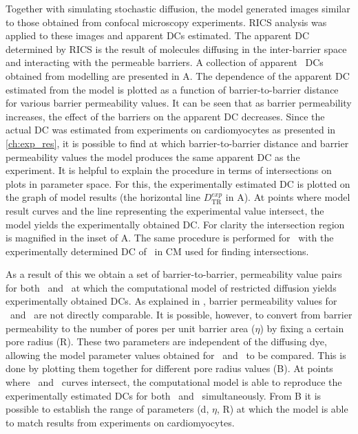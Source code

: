 Together with simulating stochastic diffusion, the model generated
images similar to those obtained from confocal microscopy experiments.
\ac{RICS} analysis was applied to these images and apparent \acp{DC}
estimated. The apparent \ac{DC} determined by \ac{RICS} is the result
of molecules diffusing in the inter-barrier space and interacting with
the permeable barriers. A collection of apparent \ATP\ \acp{DC} obtained from
modelling are presented in \F{\ref{fig:model_res}}A. The dependence of 
the apparent \ac{DC} estimated from the model is plotted as a function 
of barrier-to-barrier distance for various barrier permeability values. 
It can be seen that as barrier permeability increases, the effect of the
barriers on the apparent \ac{DC} decreases. Since the actual \ac{DC} was
estimated from experiments on cardiomyocytes as presented in
\ref{ch:exp_res}, it is possible to find at which barrier-to-barrier
distance and barrier permeability values the model produces the same
apparent \ac{DC} as the experiment. It is helpful to explain the
procedure in terms of intersections on plots in parameter space. For this, the experimentally estimated \ac{DC} is
plotted on the graph of model results (the horizontal line
$D_\mathrm{TR}^{exp}$ in \F{\ref{fig:model_res}}A). At points where
model result curves and the line representing the experimental
value intersect, the model yields the experimentally obtained \ac{DC}.
For clarity the intersection region is magnified in the inset of 
\F{\ref{fig:model_res}}A. The same procedure is performed for \DEX\ with
the experimentally determined \ac{DC} of \DEX\ in \ac{CM} used for finding
intersections. 

As a result of this we obtain a set of barrier-to-barrier, permeability
value pairs for both \ATP\ and \DEX\ at which the computational model of
restricted diffusion yields experimentally obtained \acp{DC}. As
explained in \PaperIII, barrier permeability values for \ATP\ and \DEX\
are not directly comparable. It is possible, however, to convert from barrier
permeability to the number of pores per unit barrier area ($\eta$) by fixing a
certain pore radius (R). These two parameters are independent of the
diffusing dye, allowing the model parameter values obtained for \ATP\ and \DEX\ to be
compared. This is done by plotting them together for different pore
radius values (\F{\ref{fig:model_res}}B). At points where \ATP\ and
\DEX\ curves intersect, the computational model is able to reproduce the
experimentally estimated \acp{DC} for both \ATP\ and \DEX\
simultaneously. From \F{\ref{fig:model_res}}B it is possible
to establish the range of parameters (d, $\eta$, R) at which the model
is able to match results from experiments on cardiomyocytes. 


